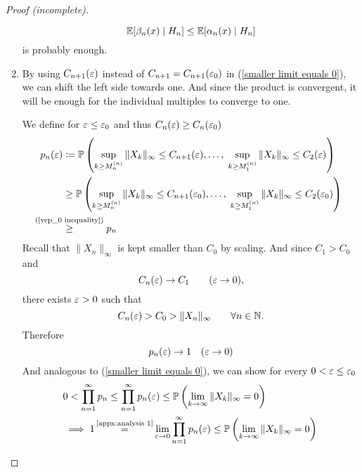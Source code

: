 \begin{proof}[Proof (incomplete)]
\begin{enumerate}[label= Step \arabic*:, ref= Step \arabic*, leftmargin=0pt]
    \[
        \mathbb{E}[\beta_n(x)\mid H_n]\le \mathbb{E}[\alpha_n(x)\mid H_n]
    \]
    is probably enough.
    \item By using \(C_{n+1}(\varepsilon)\) instead of \(C_{n+1}=C_{n+1}(\varepsilon_0)\) in (\ref{smaller limit equals 0}), we can shift the left side towards one. And since the product is convergent, it will be enough for the individual multiples to converge to one. 
    
    We define for \(\varepsilon \le \varepsilon_0\) and thus \(C_n(\varepsilon)\ge C_n(\varepsilon_0) \)
    \begin{align*}
        p_n(\vep)&\coloneqq \Pr\left(
            \sup_{k\ge M_n^{(n)}}\|X_k\|_\infty \le C_{n+1}(\vep),\dots,\;
            \sup_{k\ge M_1^{(n)}}\|X_k\|_\infty \le C_{2}(\vep)
        \right)\\
        &\ge \Pr\left(
            \sup_{k\ge M_n^{(n)}}\|X_k\|_\infty \le C_{n+1}(\vep_0),\dots,\;
            \sup_{k\ge M_1^{(n)}}\|X_k\|_\infty \le C_{2}(\vep_0)
        \right)\\
        &\lxgq{\text{(\ref{vep_0 inequality})}} p_n
    \end{align*}
    Recall that \(\|X_n\|_\infty\) is kept smaller than \(C_0\) by scaling. And since \(C_1>C_0\) and 
    \[
        C_n(\varepsilon)\to C_1 \qquad (\varepsilon \to 0),
    \]
    there exists \(\varepsilon>0\) such that 
    \[
        C_n(\varepsilon)>C_0>\|X_n\|_\infty \qquad \forall n\in\mathbb{N}.
    \]
    Therefore 
    \[
        p_n(\varepsilon)\to 1 \quad (\varepsilon\to 0)
    \]
    And analogous to (\ref{smaller limit equals 0}), we can show for every \(0<\varepsilon\le\varepsilon_0\)
    \begin{align*}
        &0<\prod_{n=1}^\infty p_n 
        \le \prod_{n=1}^\infty p_n(\vep)
        \le \Pr\left( \lim_{k\to\infty}\|X_k\|_\infty=0 \right)\\
        &\implies 1\xeq{\text{\ref{appx:analysis 1}}}\lim_{\vep\to 0}\prod_{n=1}^\infty p_n(\vep)
        \le \Pr\left( \lim_{k\to\infty}\|X_k\|_\infty=0 \right)\qedhere
    \end{align*}
\end{enumerate}
\end{proof}

